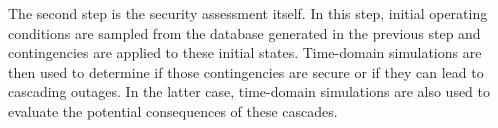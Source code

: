 %
%
%
%
%
%
%
%


The second step is the security assessment itself. In this step, initial operating conditions are sampled from the database generated in the previous step and contingencies are applied to these initial states. Time-domain simulations are then used to determine if those contingencies are secure or if they can lead to cascading outages. In the latter case, time-domain simulations are also used to evaluate the potential consequences of these cascades.

